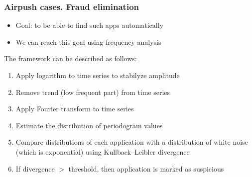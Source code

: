 \documentclass[intlimits, 9pt, unicode]{beamer}
\begin{document}
\begin{frame}
    \frametitle{Airpush cases. Fraud elimination}
    \begin{itemize}
    	\item Goal: to be able to find such apps automatically
	\item We can reach this goal using frequency analysis
    \end{itemize}
    The framework can be described as follows:
   	 \begin{enumerate}
	 \item Apply logarithm to time series to stabilyze amplitude
 	 \item Remove trend (low frequent part) from time series
	 \item Apply Fourier transform to time series
	 \item Estimate the distribution of periodogram values
	 \item Compare distributions of each application with a distribution of white noise (which is exponential) using Kullback–Leibler divergence 
	 \item If divergence $>$ threshold, then application is marked as suspicious
	\end{enumerate}
\end{frame}
\end{document}
